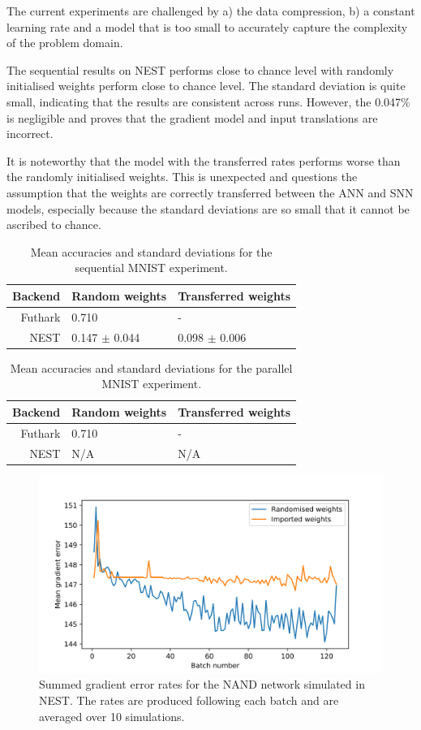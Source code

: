 \documentclass[report.tex]{subfiles}
\begin{document}
The current experiments are challenged by a) the data compression, b) a constant
learning rate and a model that is too small to accurately capture the complexity
of the problem domain.

The sequential results on NEST performs close to chance level with randomly
initialised weights perform close to chance level.
The standard deviation is quite small, indicating that the results are
consistent across runs.
However, the 0.047\% is negligible and proves that the gradient model
and input translations are incorrect.

It is noteworthy that the model with the transferred rates performs worse than
the randomly initialised weights.
This is unexpected and questions the assumption that the weights are correctly
transferred between the \gls{ANN} and \gls{SNN} models, especially because the
standard deviations are so small that it cannot be ascribed to chance.

\begin{table}
  \begin{tabular}{r l l}
  Backend & Random weights & Transferred weights \\ \hline
  Futhark & 0.710 & - \\ 
  NEST & 0.147 $\pm$ 0.044 & 0.098 $\pm$ 0.006 \\
  \end{tabular}
  \caption{Mean accuracies and standard deviations for the sequential MNIST experiment.}
  \label{tab:mnist_seq}
\end{table}

\begin{table}
  \begin{tabular}{r l l}
  Backend & Random weights & Transferred weights \\ \hline
  Futhark & 0.710 & - \\ 
  NEST & N/A & N/A \\
  \end{tabular}
  \caption{Mean accuracies and standard deviations for the parallel MNIST experiment.}
  \label{tab:mnist_par}
\end{table}

\begin{figure}
  \includegraphics[width=\linewidth]{images/mnist_snn.png}
  \caption{Summed gradient error rates for the NAND network simulated in NEST. The rates
  are produced following each batch and are averaged over 10 simulations.}
  \label{fig:nand_snn}
\end{figure}
\FloatBarrier
\end{document}
